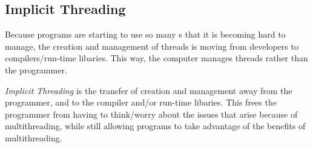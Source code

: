 \subsection{Implicit Threading}\label{subsec:Implicit_Threading}
Because programs are starting to use so many s that it is becoming hard to manage, the creation and management of threads is moving from developers to compilers/run-time libaries.
This way, the computer manages threads rather than the programmer.

\begin{definition}\label{def:Implicit_Threading}
  \emph{Implicit Threading} is the transfer of  creation and management away from the programmer, and to the compiler and/or run-time libaries.
  This frees the programmer from having to think/worry about the issues that arise because of multithreading, while still allowing programs to take advantage of the benefits of multithreading.
\end{definition}


